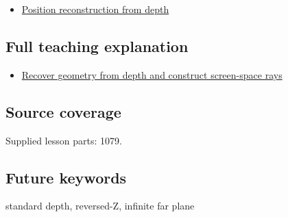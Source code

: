 \begin{itemize}
\tightlist
\item
  \hyperref[appendix-2cbf2968e866]{Position reconstruction from depth}
\end{itemize}

\subsection{Full teaching explanation}\label{full-teaching-explanation}

\begin{itemize}
\tightlist
\item
  \href{Continuous\%20Notes/Computing\%20Foundations\%20-\%20From\%20Bits\%20to\%20C++\%20and\%20Systems\%20APIs\#Recover\%20geometry\%20from\%20depth\%20and\%20construct\%20screen-space\%20rays}{Recover geometry from depth and construct screen-space rays}
\end{itemize}

\subsection{Source coverage}\label{source-coverage}

Supplied lesson parts: 1079.

\subsection{Future keywords}\label{future-keywords}

standard depth, reversed-Z, infinite far plane

